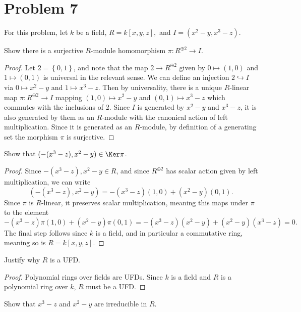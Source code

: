\documentclass[11pt, letterpaper]{article}
\begin{document}
\section{Problem 7}
For this problem, let $k$ be a field, $R=k[x,y,z],$ and $I=(x^2-y,x^3-z)$.
\begin{problem}
	Show there is a surjective $R$-module homomorphism $\pi :R^{\oplus 2} \to I$.
\end{problem}
\begin{proof}
	Let $2=\left\{ 0,1 \right\} $, and note that the map $2\to R^{\oplus 2} $ given by $0\mapsto (1,0)$ and $1\mapsto (0,1)$ is universal in the relevant sense. We can define an injection $2\hookrightarrow I$ via $0\mapsto x^2-y$ and $1\mapsto x^3-z$. Then by universality, there is a unique $R$-linear map $\pi :R^{\oplus 2} \to I$ mapping $(1,0)\mapsto x^2-y$ and $(0,1)\mapsto x^3-z$ which commutes with the inclusions of 2. Since $I$ is generated by $x^2-y$ and $x^3-z$, it is also generated by them as an $R$-module with the canonical action of left multiplication. Since it is generated as an $R$-module, by definition of a generating set the morphism $\pi $ is surjective.
\end{proof}
\begin{problem}
	Show that $(-(x^3-z),x^2-y)\in \Ker \pi $.
\end{problem}
\begin{proof}
	Since $-\left( x^3-z \right) ,x^2-y\in R$, and since $R^{\oplus 2} $ has scalar action given by left multiplication, we can write
	\[
		\left( -\left( x^3-z \right) ,x^2-y \right) =-\left( x^3-z \right) (1,0)+\left( x^2-y \right) (0,1)
	.\]
	Since $\pi $ is $R$-linear, it preserves scalar multiplication, meaning this maps under $\pi $ to the element
\[
	-\left( x^3-z \right) \pi (1,0)+\left( x^2-y \right) \pi (0,1) = -\left( x^3-z \right) \left( x^2-y \right) +\left( x^2-y \right) \left( x^3-z \right) =0
.\]
The final step follows since $k$ is a field, and in particular a commutative ring, meaning so is $R=k[x,y,z]$.
\end{proof}
\begin{problem}
	Justify why $R$ is a UFD.
\end{problem}
\begin{proof}
	Polynomial rings over fields are UFDs. Since $k$ is a field and $R$ is a polynomial ring over $k$, $R$ must be a UFD.
\end{proof}
\begin{problem}
	Show that $x^3-z$ and $x^2-y$ are irreducible in $R$.
\end{problem}
\end{document}
